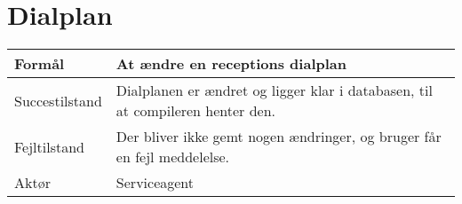 


\section{Dialplan}
\begin{table}[h]
    \begin{tabular}{|p{3cm}|p{8.3cm}|}
    \hline
    Formål         & At ændre en receptions dialplan                              \\ \hline
    Succestilstand & Dialplanen er ændret og ligger klar i databasen, til at compileren henter den.                         \\ \hline
    Fejltilstand   & Der bliver ikke gemt nogen ændringer, og bruger får en fejl meddelelse. \\ \hline
    Aktør          & Serviceagent                                                                \\ \hline
    \end{tabular}
\end{table}

